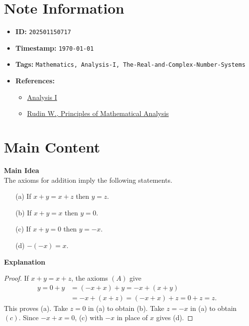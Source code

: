 \clearpage
{}
\label{202501150717}
\renewcommand{\notetitle}{Implications of the Addition Axioms}

\section*{Note Information}
\begin{itemize}
  \item \textbf{ID:} \texttt{202501150717}
  \item \textbf{Timestamp:} \texttt{\today \ \currenttime}
  \item \textbf{Tags:} \texttt{Mathematics, Analysis-I, The-Real-and-Complex-Number-Systems}
  \item \textbf{References:}
    \begin{itemize}
      \item \href{https://ocw.mit.edu/courses/18-100b-analysis-i-fall-2010/}{Analysis I}
      \item \href{/home/garrett/Personal/References/Mathematics/Analysis-I/Rudin.pdf}{Rudin W., Principles of Mathematical Analysis}
    \end{itemize}
\end{itemize}


\section*{Main Content}
\textbf{Main Idea}\\
The axioms for addition imply the following statements.
\begin{itemize}
  \item[(a)] If $x + y = x+z$ then $y=z$.
  \item[(b)] If $x+y = x$ then $y = 0$.
  \item[(c)] If $x+y = 0$ then $y = -x$.
  \item[(d)] $-(-x) = x$.\\
\end{itemize}

\textbf{Explanation}\\
\begin{proof}
  If $x + y = x + z$, the axioms $(A)$ give
  \begin{align*}
    y = 0 + y &= (-x + x) + y = -x + (x+y)\\
              &= -x + (x+z) = (-x + x) + z = 0 + z = z.
  \end{align*}
  This proves (a). Take $z = 0$ in (a) to obtain (b). Take $z = -x$ in (a) to obtain $(c)$. Since $-x + x = 0$, (c) with $-x$ in place of $x$ gives (d).
\end{proof}



